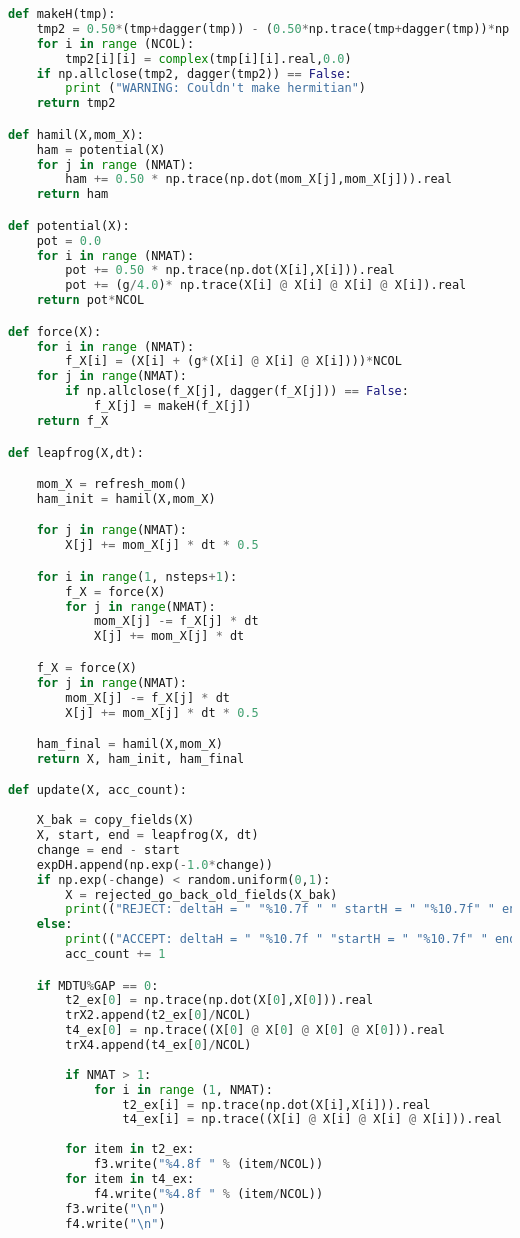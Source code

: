 \begin{lstlisting}[language=Python]
def makeH(tmp):
	tmp2 = 0.50*(tmp+dagger(tmp)) - (0.50*np.trace(tmp+dagger(tmp))*np.eye(NCOL))/NCOL
	for i in range (NCOL):
		tmp2[i][i] = complex(tmp[i][i].real,0.0)  
	if np.allclose(tmp2, dagger(tmp2)) == False:
		print ("WARNING: Couldn't make hermitian")
	return tmp2

def hamil(X,mom_X):
	ham = potential(X) 
	for j in range (NMAT):
		ham += 0.50 * np.trace(np.dot(mom_X[j],mom_X[j])).real 
	return ham  

def potential(X):
	pot = 0.0 
	for i in range (NMAT):
		pot += 0.50 * np.trace(np.dot(X[i],X[i])).real   
		pot += (g/4.0)* np.trace(X[i] @ X[i] @ X[i] @ X[i]).real
	return pot*NCOL

def force(X): 
	for i in range (NMAT): 
		f_X[i] = (X[i] + (g*(X[i] @ X[i] @ X[i])))*NCOL
	for j in range(NMAT):
		if np.allclose(f_X[j], dagger(f_X[j])) == False:
			f_X[j] = makeH(f_X[j])
	return f_X

def leapfrog(X,dt):

	mom_X = refresh_mom()
	ham_init = hamil(X,mom_X)

	for j in range(NMAT):
		X[j] += mom_X[j] * dt * 0.5 

	for i in range(1, nsteps+1):
		f_X = force(X)
		for j in range(NMAT):
			mom_X[j] -= f_X[j] * dt
			X[j] += mom_X[j] * dt

	f_X = force(X)
	for j in range(NMAT):
		mom_X[j] -= f_X[j] * dt
		X[j] += mom_X[j] * dt * 0.5 

	ham_final = hamil(X,mom_X)
	return X, ham_init, ham_final

def update(X, acc_count):
	
	X_bak = copy_fields(X) 
	X, start, end = leapfrog(X, dt) 
	change = end - start  
	expDH.append(np.exp(-1.0*change)) 
	if np.exp(-change) < random.uniform(0,1):
		X = rejected_go_back_old_fields(X_bak)
		print(("REJECT: deltaH = " "%10.7f " " startH = " "%10.7f" " endH = " "%10.7f" % (change, start, end)))
	else:
		print(("ACCEPT: deltaH = " "%10.7f " "startH = " "%10.7f" " endH = " "%10.7f" % (change, start, end)))
		acc_count += 1 

	if MDTU%GAP == 0:
		t2_ex[0] = np.trace(np.dot(X[0],X[0])).real
		trX2.append(t2_ex[0]/NCOL)
		t4_ex[0] = np.trace((X[0] @ X[0] @ X[0] @ X[0])).real
		trX4.append(t4_ex[0]/NCOL)
		
		if NMAT > 1:
			for i in range (1, NMAT):
				t2_ex[i] = np.trace(np.dot(X[i],X[i])).real
				t4_ex[i] = np.trace((X[i] @ X[i] @ X[i] @ X[i])).real
		
		for item in t2_ex:
			f3.write("%4.8f " % (item/NCOL))
		for item in t4_ex:
			f4.write("%4.8f " % (item/NCOL))
		f3.write("\n")
		f4.write("\n")


\end{lstlisting}
